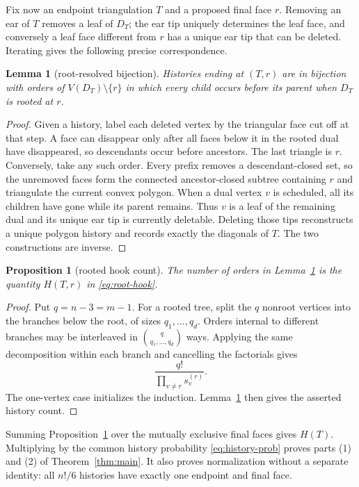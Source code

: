 \documentclass[a4paper,10pt]{amsart}
\newtheorem{proposition}[theorem]{Proposition}
\newtheorem{lemma}[theorem]{Lemma}
\theoremstyle{remark}
\begin{document}
Fix now an endpoint triangulation $T$ and a proposed final face $r$.  Removing
an ear of $T$ removes a leaf of $D_T$; the ear tip uniquely determines the
leaf face, and conversely a leaf face different from $r$ has a unique ear tip
that can be deleted.  Iterating gives the following precise correspondence.

\begin{lemma}[root-resolved bijection]\label{lem:bijection}
Histories ending at $(T,r)$ are in bijection with orders of
$V(D_T)\setminus\{r\}$ in which every child occurs before its parent when
$D_T$ is rooted at $r$.
\end{lemma}

\begin{proof}
Given a history, label each deleted vertex by the triangular face cut off at
that step.  A face can disappear only after all faces below it in the rooted
dual have disappeared, so descendants occur before ancestors.  The last
triangle is $r$.  Conversely, take any such order.  Every prefix removes a
descendant-closed set, so the unremoved faces form the connected
ancestor-closed subtree containing $r$ and triangulate the current convex
polygon.  When a dual vertex $v$ is scheduled, all its children have gone
while its parent remains.  Thus $v$ is a leaf of the remaining dual and its
unique ear tip is currently deletable.
Deleting those tips reconstructs a unique polygon history and records
exactly the diagonals of $T$.  The two constructions are inverse.
\end{proof}

\begin{proposition}[rooted hook count]\label{prop:hook}
The number of orders in Lemma~\ref{lem:bijection} is the quantity
$H(T,r)$ in \eqref{eq:root-hook}.
\end{proposition}

\begin{proof}
Put $q=n-3=m-1$.  For a rooted tree, split the $q$ nonroot vertices into
the branches below the root, of sizes $q_1,\ldots,q_d$.  Orders internal to
different branches may be interleaved in
$\binom{q}{q_1,\ldots,q_d}$ ways.  Applying the same decomposition within
each branch and cancelling the factorials gives
\[
 \frac{q!}{\prod_{v\ne r}s_v^{(r)}}.
\]
The one-vertex case initializes the induction.  Lemma~\ref{lem:bijection}
then gives the asserted history count.
\end{proof}

Summing Proposition~\ref{prop:hook} over the mutually exclusive final faces
gives $H(T)$.  Multiplying by the common history probability
\eqref{eq:history-prob} proves parts (1) and (2) of
Theorem~\ref{thm:main}.  It also proves normalization without a separate
identity: all $n!/6$ histories have exactly one endpoint and final face.
\end{document}
